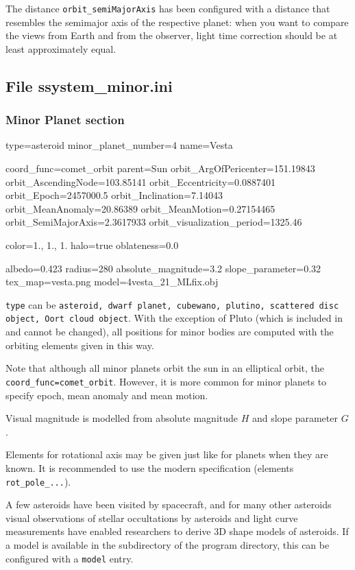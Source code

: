 The distance \texttt{orbit\_semiMajorAxis} has been configured with a
distance that resembles the semimajor axis of the respective planet:
when you want to compare the views from Earth and from the observer,
light time correction should be at least approximately equal.

\subsection{File ssystem\_minor.ini}
\label{sec:ssystem.ini:minor}

\subsubsection{Minor Planet section}
\label{sec:ssystem.ini:MinorPlanet}

\begin{configfile}
[4vesta]
type=asteroid  
minor_planet_number=4
name=Vesta

coord_func=comet_orbit
parent=Sun
orbit_ArgOfPericenter=151.19843
orbit_AscendingNode=103.85141
orbit_Eccentricity=0.0887401
orbit_Epoch=2457000.5
orbit_Inclination=7.14043
orbit_MeanAnomaly=20.86389
orbit_MeanMotion=0.27154465
orbit_SemiMajorAxis=2.3617933
orbit_visualization_period=1325.46

color=1., 1., 1.
halo=true
oblateness=0.0

albedo=0.423
radius=280
absolute_magnitude=3.2
slope_parameter=0.32
tex_map=vesta.png
model=4vesta_21_MLfix.obj
\end{configfile}

\texttt{type} can be \texttt{asteroid, dwarf planet, cubewano,
  plutino, scattered disc object, Oort cloud object}. With the
exception of Pluto (which is included in  and cannot be changed), 
all positions for minor bodies are computed with the orbiting elements given in this way. 

Note that although all minor planets orbit the sun in an
elliptical orbit, the \texttt{coord\_func=comet\_orbit}. However, it
is more common for minor planets to specify epoch, mean anomaly and
mean motion.

Visual magnitude is modelled from absolute magnitude $H$ and slope parameter $G$.

Elements for rotational axis may be given just like for planets when
they are known. It is recommended to use the modern specification
(elements \texttt{rot\_pole\_...}).

A few asteroids have been visited by spacecraft, 
and for many other asteroids visual observations of stellar occultations 
by asteroids and light curve measurements have enabled researchers to derive 
3D shape models of asteroids. If a model is available in the  
subdirectory of the program directory, this can be configured with a \texttt{model} entry.


